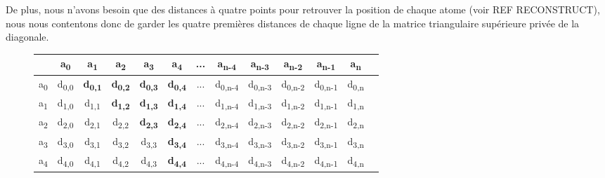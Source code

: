 \par De plus, nous n'avons besoin que des distances à quatre points pour retrouver la position de chaque atome (voir REF RECONSTRUCT), nous nous contentons donc de garder les quatre premières distances de chaque ligne de la matrice triangulaire supérieure privée de la diagonale.


\begin{figure}[h!]
	\centering
	
	
	\begin{tabular}{c|c|c|c|c|c|c|c|c|c|c|c|c}
	    & a\textsubscript{0} & a\textsubscript{1} & a\textsubscript{2} & a\textsubscript{3} & a\textsubscript{4} & ... & a\textsubscript{n-4} & a\textsubscript{n-3} & a\textsubscript{n-2} & 
	    	 a\textsubscript{n-1}  & a\textsubscript{n}\\ \hline
		a\textsubscript{0} & d\textsubscript{0,0} & \textbf{d\textsubscript{0,1}} & \textbf{d\textsubscript{0,2}} & 
		    \textbf{d\textsubscript{0,3}} & \textbf{d\textsubscript{0,4}} & ... & d\textsubscript{0,n-4} & 
		    d\textsubscript{0,n-3} & d\textsubscript{0,n-2} & d\textsubscript{0,n-1}
		    & d\textsubscript{0,n} \\ \hline
		a\textsubscript{1} & d\textsubscript{1,0} & d\textsubscript{1,1} & \textbf{d\textsubscript{1,2}} & 
			\textbf{d\textsubscript{1,3}} & \textbf{d\textsubscript{1,4}} & ... & d\textsubscript{1,n-4} & 
			d\textsubscript{1,n-3} & d\textsubscript{1,n-2} & d\textsubscript{1,n-1} & 
			d\textsubscript{1,n} \\ \hline
		a\textsubscript{2} & d\textsubscript{2,0} & d\textsubscript{2,1} & d\textsubscript{2,2} &
			\textbf{d\textsubscript{2,3}} & \textbf{d\textsubscript{2,4}} & ... & d\textsubscript{2,n-4} & 
			d\textsubscript{2,n-3} & d\textsubscript{2,n-2} & d\textsubscript{2,n-1} & 
			d\textsubscript{2,n} \\ \hline
		a\textsubscript{3} & d\textsubscript{3,0} & d\textsubscript{3,1} & d\textsubscript{3,2} & 
			d\textsubscript{3,3} & \textbf{d\textsubscript{3,4}} & ... & d\textsubscript{3,n-4} & 
			d\textsubscript{3,n-3} & d\textsubscript{3,n-2} & d\textsubscript{3,n-1} & 
			d\textsubscript{3,n} \\ \hline
			
		a\textsubscript{4} & d\textsubscript{4,0} & d\textsubscript{4,1} & d\textsubscript{4,2} & 
			d\textsubscript{4,3} & \textbf{d\textsubscript{4,4}} & ... & d\textsubscript{4,n-4} & 
			d\textsubscript{4,n-3} & d\textsubscript{4,n-2} & d\textsubscript{4,n-1} & 
			d\textsubscript{4,n} \\ \hline
			

\end{tabular}
\end{figure}
